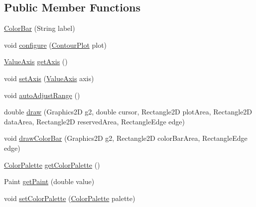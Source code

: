 \subsection*{Public Member Functions}
\begin{DoxyCompactItemize}
\item 
\mbox{\hyperlink{classorg_1_1jfree_1_1chart_1_1axis_1_1_color_bar_a9ece354ede157da87da26103e85be4ee}{Color\+Bar}} (String label)
\item 
void \mbox{\hyperlink{classorg_1_1jfree_1_1chart_1_1axis_1_1_color_bar_a4ffed2a6f7c447c463e583fff36a206f}{configure}} (\mbox{\hyperlink{classorg_1_1jfree_1_1chart_1_1plot_1_1_contour_plot}{Contour\+Plot}} plot)
\item 
\mbox{\hyperlink{classorg_1_1jfree_1_1chart_1_1axis_1_1_value_axis}{Value\+Axis}} \mbox{\hyperlink{classorg_1_1jfree_1_1chart_1_1axis_1_1_color_bar_a0bf7d8febae75de3f3b4b3902cea5c77}{get\+Axis}} ()
\item 
void \mbox{\hyperlink{classorg_1_1jfree_1_1chart_1_1axis_1_1_color_bar_a91032a049bb8308f3ec6840cc5fbc210}{set\+Axis}} (\mbox{\hyperlink{classorg_1_1jfree_1_1chart_1_1axis_1_1_value_axis}{Value\+Axis}} axis)
\item 
void \mbox{\hyperlink{classorg_1_1jfree_1_1chart_1_1axis_1_1_color_bar_a8d7661ead21c37e7dcfc55ad89cc22b7}{auto\+Adjust\+Range}} ()
\item 
double \mbox{\hyperlink{classorg_1_1jfree_1_1chart_1_1axis_1_1_color_bar_ac0cf4dd5946682d0f9cb6df6941eb3be}{draw}} (Graphics2D g2, double cursor, Rectangle2D plot\+Area, Rectangle2D data\+Area, Rectangle2D reserved\+Area, Rectangle\+Edge edge)
\item 
void \mbox{\hyperlink{classorg_1_1jfree_1_1chart_1_1axis_1_1_color_bar_ac917d4518342fe0e034c9e940f5182f0}{draw\+Color\+Bar}} (Graphics2D g2, Rectangle2D color\+Bar\+Area, Rectangle\+Edge edge)
\item 
\mbox{\hyperlink{classorg_1_1jfree_1_1chart_1_1plot_1_1_color_palette}{Color\+Palette}} \mbox{\hyperlink{classorg_1_1jfree_1_1chart_1_1axis_1_1_color_bar_a6e29af1d1ea42b066fb5e0123541eac0}{get\+Color\+Palette}} ()
\item 
Paint \mbox{\hyperlink{classorg_1_1jfree_1_1chart_1_1axis_1_1_color_bar_afe92537a6910ae2a2615008410779875}{get\+Paint}} (double value)
\item 
void \mbox{\hyperlink{classorg_1_1jfree_1_1chart_1_1axis_1_1_color_bar_ade1488f7c06599fe39bdb4e32cfa862a}{set\+Color\+Palette}} (\mbox{\hyperlink{classorg_1_1jfree_1_1chart_1_1plot_1_1_color_palette}{Color\+Palette}} palette)

\end{DoxyCompactItemize}

